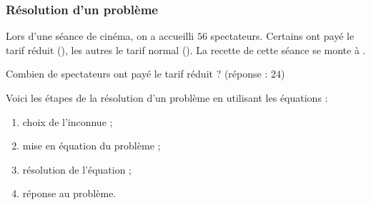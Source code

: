 \documentclass[10pt,openright,twoside,french]{book}
\begin{document}
\subsubsection{Résolution d'un problème}
\begin{Exemple}
    Lors d'une séance de cinéma, on a accueilli $56$ spectateurs. Certains ont payé le tarif réduit (), les autres le tarif normal (). La recette de cette séance se monte à .\par Combien de spectateurs ont payé le tarif réduit ? (réponse : $24$)
\end{Exemple}

Voici les étapes de la résolution d'un problème en utilisant les équations :
\begin{enumerate}
    \item choix de l'inconnue ;
    \item mise en équation du problème ;
    \item résolution de l'équation ;
    \item réponse au problème.
\end{enumerate}
\end{document}
